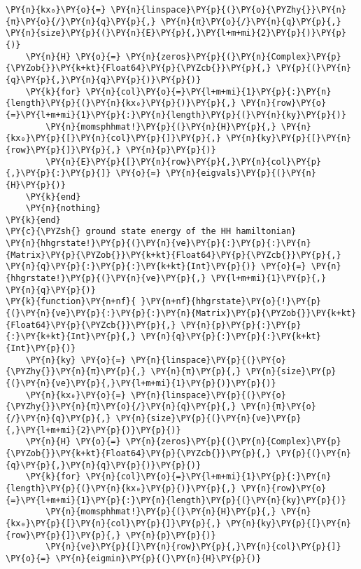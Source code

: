 \begin{Verbatim}[commandchars=\\\{\}]
    \PY{n}{kx₀}\PY{o}{=} \PY{n}{linspace}\PY{p}{(}\PY{o}{\PYZhy{}}\PY{n}{π}\PY{o}{/}\PY{n}{q}\PY{p}{,} \PY{n}{π}\PY{o}{/}\PY{n}{q}\PY{p}{,} \PY{n}{size}\PY{p}{(}\PY{n}{E}\PY{p}{,}\PY{l+m+mi}{2}\PY{p}{)}\PY{p}{)}
    \PY{n}{H} \PY{o}{=} \PY{n}{zeros}\PY{p}{(}\PY{n}{Complex}\PY{p}{\PYZob{}}\PY{k+kt}{Float64}\PY{p}{\PYZcb{}}\PY{p}{,} \PY{p}{(}\PY{n}{q}\PY{p}{,}\PY{n}{q}\PY{p}{)}\PY{p}{)}
    \PY{k}{for} \PY{n}{col}\PY{o}{=}\PY{l+m+mi}{1}\PY{p}{:}\PY{n}{length}\PY{p}{(}\PY{n}{kx₀}\PY{p}{)}\PY{p}{,} \PY{n}{row}\PY{o}{=}\PY{l+m+mi}{1}\PY{p}{:}\PY{n}{length}\PY{p}{(}\PY{n}{ky}\PY{p}{)}
        \PY{n}{momsphhmat!}\PY{p}{(}\PY{n}{H}\PY{p}{,} \PY{n}{kx₀}\PY{p}{[}\PY{n}{col}\PY{p}{]}\PY{p}{,} \PY{n}{ky}\PY{p}{[}\PY{n}{row}\PY{p}{]}\PY{p}{,} \PY{n}{p}\PY{p}{)}
        \PY{n}{E}\PY{p}{[}\PY{n}{row}\PY{p}{,}\PY{n}{col}\PY{p}{,}\PY{p}{:}\PY{p}{]} \PY{o}{=} \PY{n}{eigvals}\PY{p}{(}\PY{n}{H}\PY{p}{)}
    \PY{k}{end}
    \PY{n}{nothing}
\PY{k}{end}
\PY{c}{\PYZsh{} ground state energy of the HH hamiltonian}
\PY{n}{hhgrstate!}\PY{p}{(}\PY{n}{ve}\PY{p}{:}\PY{p}{:}\PY{n}{Matrix}\PY{p}{\PYZob{}}\PY{k+kt}{Float64}\PY{p}{\PYZcb{}}\PY{p}{,} \PY{n}{q}\PY{p}{:}\PY{p}{:}\PY{k+kt}{Int}\PY{p}{)} \PY{o}{=} \PY{n}{hhgrstate!}\PY{p}{(}\PY{n}{ve}\PY{p}{,} \PY{l+m+mi}{1}\PY{p}{,} \PY{n}{q}\PY{p}{)}
\PY{k}{function}\PY{n+nf}{ }\PY{n+nf}{hhgrstate}\PY{o}{!}\PY{p}{(}\PY{n}{ve}\PY{p}{:}\PY{p}{:}\PY{n}{Matrix}\PY{p}{\PYZob{}}\PY{k+kt}{Float64}\PY{p}{\PYZcb{}}\PY{p}{,} \PY{n}{p}\PY{p}{:}\PY{p}{:}\PY{k+kt}{Int}\PY{p}{,} \PY{n}{q}\PY{p}{:}\PY{p}{:}\PY{k+kt}{Int}\PY{p}{)}
    \PY{n}{ky} \PY{o}{=} \PY{n}{linspace}\PY{p}{(}\PY{o}{\PYZhy{}}\PY{n}{π}\PY{p}{,} \PY{n}{π}\PY{p}{,} \PY{n}{size}\PY{p}{(}\PY{n}{ve}\PY{p}{,}\PY{l+m+mi}{1}\PY{p}{)}\PY{p}{)}
    \PY{n}{kx₀}\PY{o}{=} \PY{n}{linspace}\PY{p}{(}\PY{o}{\PYZhy{}}\PY{n}{π}\PY{o}{/}\PY{n}{q}\PY{p}{,} \PY{n}{π}\PY{o}{/}\PY{n}{q}\PY{p}{,} \PY{n}{size}\PY{p}{(}\PY{n}{ve}\PY{p}{,}\PY{l+m+mi}{2}\PY{p}{)}\PY{p}{)}
    \PY{n}{H} \PY{o}{=} \PY{n}{zeros}\PY{p}{(}\PY{n}{Complex}\PY{p}{\PYZob{}}\PY{k+kt}{Float64}\PY{p}{\PYZcb{}}\PY{p}{,} \PY{p}{(}\PY{n}{q}\PY{p}{,}\PY{n}{q}\PY{p}{)}\PY{p}{)}
    \PY{k}{for} \PY{n}{col}\PY{o}{=}\PY{l+m+mi}{1}\PY{p}{:}\PY{n}{length}\PY{p}{(}\PY{n}{kx₀}\PY{p}{)}\PY{p}{,} \PY{n}{row}\PY{o}{=}\PY{l+m+mi}{1}\PY{p}{:}\PY{n}{length}\PY{p}{(}\PY{n}{ky}\PY{p}{)}
        \PY{n}{momsphhmat!}\PY{p}{(}\PY{n}{H}\PY{p}{,} \PY{n}{kx₀}\PY{p}{[}\PY{n}{col}\PY{p}{]}\PY{p}{,} \PY{n}{ky}\PY{p}{[}\PY{n}{row}\PY{p}{]}\PY{p}{,} \PY{n}{p}\PY{p}{)}
        \PY{n}{ve}\PY{p}{[}\PY{n}{row}\PY{p}{,}\PY{n}{col}\PY{p}{]} \PY{o}{=} \PY{n}{eigmin}\PY{p}{(}\PY{n}{H}\PY{p}{)}

\end{Verbatim}
